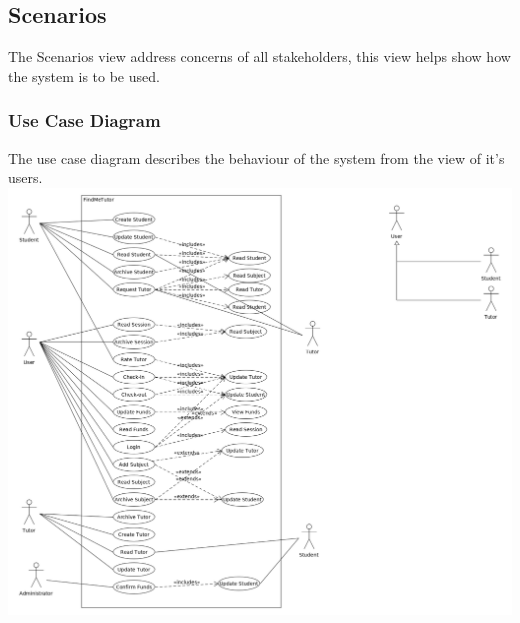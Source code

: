 \documentclass[12pt]{article}
\begin{document}
\subsection{Scenarios}
The Scenarios view address concerns of all stakeholders, this view helps show how the system is to be used.
\subsubsection{Use Case Diagram}
The use case diagram describes the behaviour of the system from the view of it's users.\\
\includegraphics[width=170mm]{./Use_Case_Diagram.png}
\end{document}
